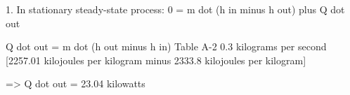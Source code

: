 1. In stationary steady-state process:  
0 = m dot (h in minus h out) plus Q dot out  

Q dot out = m dot (h out minus h in)  
Table A-2  
0.3 kilograms per second [2257.01 kilojoules per kilogram minus 2333.8 kilojoules per kilogram]  

=> Q dot out = 23.04 kilowatts